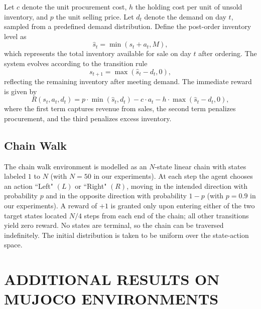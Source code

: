 \documentclass[twoside]{article}
\theoremstyle{plain}
\theoremstyle{definition}
\theoremstyle{remark}
\begin{document}
Let \( c \) denote the unit procurement cost, \( h \) the holding cost per unit of unsold inventory, and \( p \) the unit selling price. Let \( d_t \) denote the demand on day \( t \), sampled from a predefined demand distribution. Define the post-order inventory level as
\[
\hat{s}_t = \min(s_t + a_t, M),
\]
which represents the total inventory available for sale on day \( t \) after ordering. The system evolves according to the transition rule
\[
s_{t+1} = \max(\hat{s}_t - d_t, 0),
\]
reflecting the remaining inventory after meeting demand. The immediate reward is given by
\[
R(s_t, a_t, d_t) = p \cdot \min(\hat{s}_t, d_t) - c \cdot a_t - h \cdot \max(\hat{s}_t - d_t, 0),
\]
where the first term captures revenue from sales, the second term penalizes procurement, and the third penalizes excess inventory.


\subsection{Chain Walk}

The chain walk environment is modelled as an $N$-state linear chain with states labeled $1$ to $N$ (with $N=50$ in our experiments). At each step the agent chooses an action ``Left" $(L)$ or ``Right" $(R)$, moving in the intended direction with probability $p$ and in the opposite direction with probability $1-p$ (with $p=0.9$ in our experiments). A reward of $+1$ is granted only upon entering either of the two target states located $N/4$ steps from each end of the chain; all other transitions yield zero reward. No states are terminal, so the chain can be traversed indefinitely. The initial distribution is taken to be uniform over the state-action space.



\section{ADDITIONAL RESULTS ON MUJOCO ENVIRONMENTS}
\label{sec:appendix_all_mujoco_exps}
\end{document}
